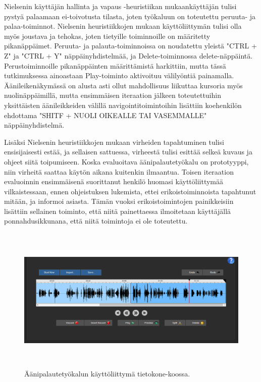 \documentclass[utf8]{gradu3}
\begin{document}
Nielsenin käyttäjän hallinta ja vapaus -heuristiikan mukaankäyttäjän tulisi pystyä palaamaan ei-toivotusta tilasta, joten työkaluun on toteutettu peruuta- ja palaa-toiminnot. Nielsenin heuristiikkojen mukaan käyttöliittymän tulisi olla myös joustava ja tehokas, joten tietyille toiminnoille on määritetty pikanäppäimet. Peruuta- ja palauta-toiminnoissa on noudatettu yleistä "CTRL + Z" ja "CTRL + Y" näppäinyhdistelmää, ja Delete-toiminnossa delete-näppäintä. Perustoiminnoille pikanäppäinten määrittämistä harkittiin, mutta tässä tutkimuksessa ainoastaan Play-toiminto aktivoituu välilyöntiä painamalla. Äänileikenäkymässä on alusta asti ollut mahdollisuus liikuttaa kursoria myös nuolinäppäimillä, mutta ensimmäisen iteraation jälkeen toteutettuihin yksittäisten äänileikkeiden välillä navigointitoimintoihin lisättiin koehenkilön ehdottama "SHITF + NUOLI OIKEALLE TAI VASEMMALLE" näppäinyhdistelmä.

Lisäksi Nielsenin heuristiikkojen mukaan virheiden tapahtuminen tulisi ensisijaisesti estää, ja sellaisen sattuessa, virheestä tulisi esittää selkeä kuvaus ja ohjeet siitä toipumiseen. Koska evaluoitava äänipalautetyökalu on prototyyppi, niin virheitä saattaa käytön aikana kuitenkin ilmaantua. Toisen iteraation evaluoinnin ensimmäisenä suorittanut henkilö huomasi käyttöliittymää vilkaistessaan, ennen ohjeistuksen lukemista, ettei erikoistoiminnoista tapahtunut mitään, ja informoi asiasta. Tämän vuoksi erikoistoimintojen painikkeisiin lisättiin sellainen toiminto, että niitä painettaessa ilmoitetaan käyttäjällä ponnahdusikkunana, että niitä toimintoja ei ole toteutettu.

\begin{figure}[H]\centering
  \includegraphics[height=7cm,keepaspectratio]{UI}
  \caption[]{Äänipalautetyökalun käyttöliittymä tietokone-koossa.}
  \label{fig:UI}
\end{figure}
\end{document}
